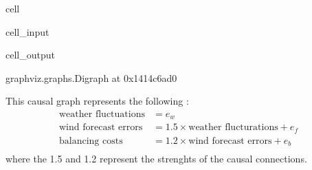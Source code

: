 \documentclass[letterpaper,10pt,english]{jupyterBook}
\begin{document}
\begin{sphinxuseclass}{cell}\begin{sphinxVerbatimInput}

\begin{sphinxuseclass}{cell_input}
\begin{sphinxVerbatim}[commandchars=\\\{\}]
   
   

  \PYG{p}{[}\PYG{p}{[}  \PYG{p}{]}
              \PYG{p}{[}  \PYG{p}{]}
              \PYG{p}{[}  \PYG{p}{]}\PYG{p}{]}

 \PYG{p}{[}  \PYG{p}{]}
\end{sphinxVerbatim}

\end{sphinxuseclass}\end{sphinxVerbatimInput}
\begin{sphinxVerbatimOutput}

\begin{sphinxuseclass}{cell_output}
\begin{sphinxVerbatim}[commandchars=\\\{\}]
\PYGZlt{}graphviz.graphs.Digraph at 0x1414c6ad0\PYGZgt{}
\end{sphinxVerbatim}

\end{sphinxuseclass}\end{sphinxVerbatimOutput}

\end{sphinxuseclass}
\sphinxAtStartPar
This causal graph represents the following :
\label{equation:notebooks/basic_dag_structures:077da518-0f47-45ba-a01a-c2909f4dfb52}\begin{align}
\text{weather fluctuations} &= e_w \\
\text{wind forecast errors} &= 1.5 \times \text{weather flucturations} + e_f \\
\text{balancing costs} &= 1.2 \times \text{wind forecast errors} + e_b \\
\end{align}
\sphinxAtStartPar
where the  1.5 and 1.2 represent the strenghts of the causal connections.
\end{document}
